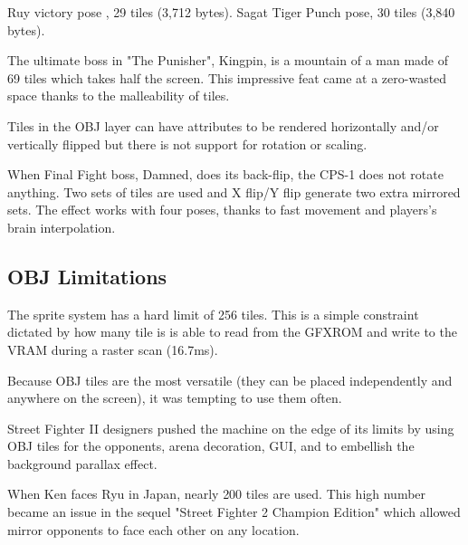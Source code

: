 Ruy victory pose , 29 tiles (3,712 bytes). Sagat Tiger Punch pose, 30 tiles (3,840 bytes). 




The ultimate boss in "The Punisher", Kingpin, is a mountain of a man made of 69 tiles which takes half the screen. This impressive feat came at a zero-wasted space thanks to the malleability of tiles.


Tiles in the OBJ layer can have attributes to be rendered horizontally and/or vertically flipped but there is not support for rotation or scaling.

\begin{minipage}[t]{0.535\linewidth}
\end{minipage}%
\hfill%
\begin{minipage}[t]{0.445\linewidth}
\end{minipage}

 When Final Fight boss, Damned, does its back-flip, the CPS-1 does not rotate anything. Two sets of tiles are used and X flip/Y flip generate two extra mirrored sets. The effect works with four poses, thanks to fast movement and players's brain interpolation.


\pagebreak

\subsection{OBJ Limitations}
The sprite system has a hard limit of 256 tiles. This is a simple constraint dictated by how many tile is is able to read from the GFXROM and write to the VRAM during a raster scan (16.7ms).

Because OBJ tiles are the most versatile (they can be placed independently and anywhere on the screen), it was tempting to use them often.

Street Fighter II designers pushed the machine on the edge of its limits by using OBJ tiles for the opponents, arena decoration, GUI, and to embellish the background parallax effect.

When Ken faces Ryu in Japan, nearly 200 tiles are used. This high number became an issue in the sequel "Street Fighter 2 Champion Edition" which allowed mirror opponents to face each other on any location.
\vfill
{}
\pagebreak

